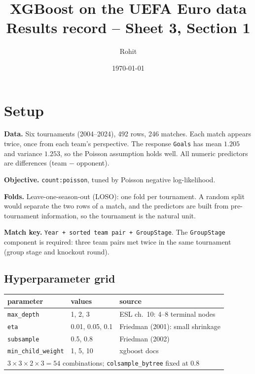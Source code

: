 \documentclass[11pt,a4paper]{article}
\title{XGBoost on the UEFA Euro data\\[0.3em]
       \large Results record -- Sheet 3, Section 1}
\author{Rohit}
\date{\today}
\begin{document}
\maketitle

\section{Setup}

\textbf{Data.} Six tournaments (2004--2024), 492 rows, 246 matches.
Each match appears twice, once from each team's perspective. The response
\texttt{Goals} has mean $1.205$ and variance $1.253$, so the Poisson
assumption holds well. All numeric predictors are differences
(team $-$ opponent).

\textbf{Objective.} \texttt{count:poisson}, tuned by Poisson negative
log-likelihood.

\textbf{Folds.} Leave-one-season-out (LOSO): one fold per tournament.
A random split would separate the two rows of a match, and the predictors
are built from pre-tournament information, so the tournament is the
natural unit.

\textbf{Match key.} \texttt{Year + sorted team pair + GroupStage}. The
\texttt{GroupStage} component is required: three team pairs met twice in
the same tournament (group stage and knockout round).

\subsection*{Hyperparameter grid}

\begin{center}
\begin{tabular}{lll}
  \toprule
  parameter & values & source \\
  \midrule
  \texttt{max\_depth}        & 1, 2, 3          & ESL ch.\ 10: 4--8 terminal nodes \\
  \texttt{eta}               & 0.01, 0.05, 0.1  & Friedman (2001): small shrinkage \\
  \texttt{subsample}         & 0.5, 0.8         & Friedman (2002) \\
  \texttt{min\_child\_weight} & 1, 5, 10         & xgboost docs \\
  \midrule
  \multicolumn{3}{l}{$3 \times 3 \times 2 \times 3 = 54$ combinations;
    \texttt{colsample\_bytree} fixed at 0.8} \\
  \bottomrule
\end{tabular}
\end{center}
\end{document}
